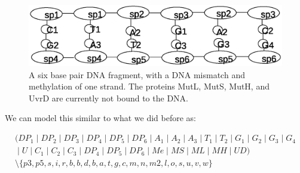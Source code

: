 \documentclass[review]{elsarticle}
\newcommand{\paral}{\; \vert \;}
\begin{document}
\begin{figure}[h!]
  \centering
    \includegraphics[width=1.0\textwidth]{mmr/state1}
  \caption[A six base pair DNA fragment.]{A six base pair DNA fragment, with a DNA mismatch and methylation of one strand. The proteins MutL, MutS, MutH, and UvrD are currently not bound to the DNA.}
  \label{fig:state1}
\end{figure}

We can model this similar to what we did before as:

$$\begin{array}{l}
(DP_1 \paral DP_2 \paral DP_3 \paral DP_4 \paral DP_5 \paral DP_6 \paral A_1 \paral A_2 \paral A_3 \paral T_1 \paral T_2 \paral G_1 \paral G_2 \paral G_3 \paral G_4\\
\paral U \paral C_1 \paral C_2 \paral C_3 \paral DP_4 \paral DP_5 \paral DP_6 \paral Me \paral MS \paral ML \paral MH \paral UD) \\
\setminus\{p3, p5, s, i, r, b, b, d, b, a, t, g, c, m, n, m2, l, o, s, u, v, w\} 
\end{array}$$ 
\end{document}
